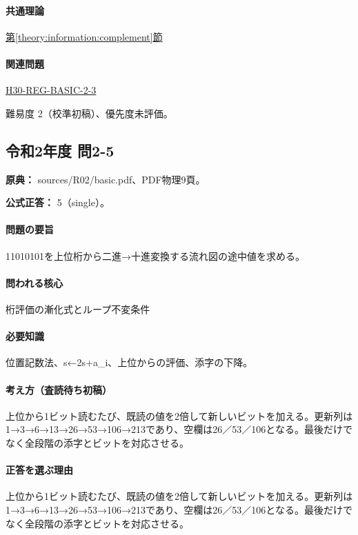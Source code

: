 \paragraph{共通理論} \hyperref[theory:information:complement]{第\ref*{theory:information:complement}節}

\paragraph{関連問題} \hyperref[q:h30-reg-basic-2-3]{H30-REG-BASIC-2-3}

\par 難易度 2（校準初稿）、優先度未評価。

\subsection{令和2年度 問2-5}
\label{q:r02-reg-basic-2-5}

\noindent\textbf{原典：} sources/R02/basic.pdf、PDF物理9頁。

\textbf{公式正答：} 5（single）。

\paragraph{問題の要旨} 11010101を上位桁から二進→十進変換する流れ図の途中値を求める。

\paragraph{問われる核心} 桁評価の漸化式とループ不変条件

\paragraph{必要知識} 位置記数法、s←2s+a\_i、上位からの評価、添字の下降。

\paragraph{考え方（査読待ち初稿）} 上位から1ビット読むたび、既読の値を2倍して新しいビットを加える。更新列は1→3→6→13→26→53→106→213であり、空欄は26／53／106となる。最後だけでなく全段階の添字とビットを対応させる。

\paragraph{正答を選ぶ理由} 上位から1ビット読むたび、既読の値を2倍して新しいビットを加える。更新列は1→3→6→13→26→53→106→213であり、空欄は26／53／106となる。最後だけでなく全段階の添字とビットを対応させる。

